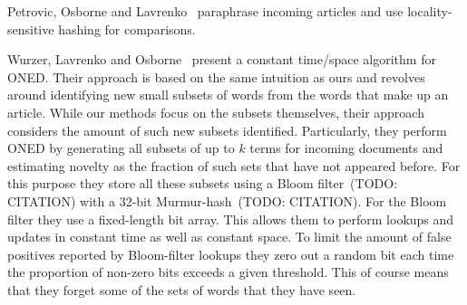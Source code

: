 
Petrovic, Osborne and Lavrenko~\cite{petrovic2012using} paraphrase incoming articles and use locality-sensitive hashing for comparisons. 

Wurzer, Lavrenko and Osborne~\cite{wurzer2015kterm} present a constant time/space algorithm for ONED. Their approach is based on the same intuition as ours and revolves around identifying new small subsets of words from the words that make up an article. While our methods focus on the subsets themselves, their approach considers the amount of such new subsets identified. Particularly, they perform ONED by generating all subsets of up to $k$ terms for incoming documents and estimating novelty as the fraction of such sets that have not appeared before. 
For this purpose they store all these subsets using a Bloom filter~(TODO: CITATION) with a 32-bit Murmur-hash~(TODO: CITATION). For the Bloom filter they use a fixed-length bit array. This allows them to perform lookups and updates in constant time as well as constant space. To limit the amount of false positives reported by Bloom-filter lookups they zero out a random bit each time the proportion of non-zero bits exceeds a given threshold. This of course means that they forget some of the sets of words that they have seen.
